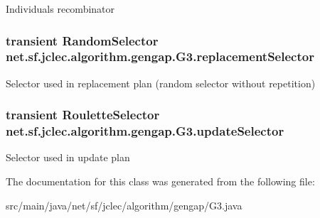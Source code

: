 Individuals recombinator \hypertarget{classnet_1_1sf_1_1jclec_1_1algorithm_1_1gengap_1_1_g3_ae51e516d5ceb1f80ae931bce9319d255}{
\subsubsection[{replacement\-Selector}]{\setlength{\rightskip}{0pt plus 5cm}transient {\bf Random\-Selector} net.\-sf.\-jclec.\-algorithm.\-gengap.\-G3.\-replacement\-Selector\hspace{0.3cm}{\ttfamily [protected]}}}\label{classnet_1_1sf_1_1jclec_1_1algorithm_1_1gengap_1_1_g3_ae51e516d5ceb1f80ae931bce9319d255}
Selector used in replacement plan (random selector without repetition) \hypertarget{classnet_1_1sf_1_1jclec_1_1algorithm_1_1gengap_1_1_g3_ac9eb67ba0b3d5f8a0301e9df03ec5130}{
\subsubsection[{update\-Selector}]{\setlength{\rightskip}{0pt plus 5cm}transient {\bf Roulette\-Selector} net.\-sf.\-jclec.\-algorithm.\-gengap.\-G3.\-update\-Selector\hspace{0.3cm}{\ttfamily [protected]}}}\label{classnet_1_1sf_1_1jclec_1_1algorithm_1_1gengap_1_1_g3_ac9eb67ba0b3d5f8a0301e9df03ec5130}
Selector used in update plan 

The documentation for this class was generated from the following file\-:\begin{DoxyCompactItemize}
\item 
src/main/java/net/sf/jclec/algorithm/gengap/G3.\-java\end{DoxyCompactItemize}
